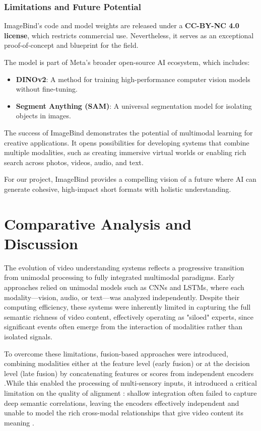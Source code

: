\documentclass[12pt,a4paper,oneside,english]{book}
\begin{document}
\subsubsection{Limitations and Future Potential}
\label{subsubsec:limitations_future}

ImageBind's code and model weights are released under a \textbf{CC-BY-NC 4.0 license}, which restricts commercial use. Nevertheless, it serves as an exceptional proof-of-concept and blueprint for the field.

The model is part of Meta's broader open-source AI ecosystem, which includes:
\begin{itemize}
    \item \textbf{DINOv2}: A method for training high-performance computer vision models without fine-tuning.
    \item \textbf{Segment Anything (SAM)}: A universal segmentation model for isolating objects in images.
\end{itemize}

The success of ImageBind demonstrates the potential of multimodal learning for creative applications. It opens possibilities for developing systems that combine multiple modalities, such as creating immersive virtual worlds or enabling rich search across photos, videos, audio, and text.

For our project, ImageBind provides a compelling vision of a future where AI can generate cohesive, high-impact short formats with holistic understanding.


\section{Comparative Analysis and Discussion}%
The evolution of video understanding systems reflects a progressive transition from unimodal processing to fully integrated multimodal paradigms.  Early approaches relied on unimodal models such as CNNs and LSTMs, where each modality—vision, audio, or text—was analyzed independently. Despite their computing efficiency, these systems were inherently limited in capturing the full semantic richness of video content, effectively operating as "siloed" experts, since significant events often emerge from the interaction of modalities rather than isolated signals\citep{baltruvsaitis2019multimodal}.

To overcome these limitations, fusion-based approaches were introduced, combining modalities either at the feature level (early fusion) or at 
the decision level (late fusion) by concatenating features or scores from independent encoders .While this enabled the processing of multi-sensory inputs,  it introduced a critical limitation on the quality of alignment : shallow integration often failed to capture deep semantic correlations, leaving the encoders effectively independent 
and unable to model the rich cross-modal relationships that give video content its meaning \citep{liu2024multimodalfusion}.
\end{document}
